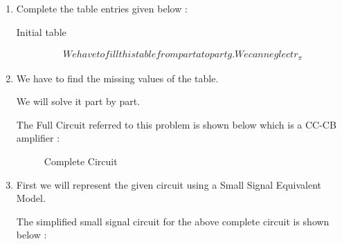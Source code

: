 \begin{enumerate}[label=\thesubsection.\arabic*.,ref=\thesubsection.\theenumi]
\item
Complete the table entries given below :

\vspace{1cm}

\solution

\begin{table}[!ht]
\centering
{}
\caption{Initial table}
\label{Table}
\end{table}

\begin{align}

 We have to fill this table from part a to part g. We can neglect r_{\pi}    

\end{align}


\item
We have to find the missing values of the table.
\vspace{0.2cm}

\solution
We will solve it part by part.
\vspace{0.2cm}


\vspace{1cm}

The Full Circuit referred to this problem is shown below which is a CC-CB amplifier : 

\vspace{25cm}



\begin{figure}[!ht]
	\begin{center}
				\resizebox{\columnwidth}{!}{}
	\end{center}
\caption{Complete Circuit }
\label{fig:circuit_1}
\end{figure}

\vspace{0.3cm}





\item
First we will represent the given circuit using a Small Signal Equivalent Model.

\vspace{0.2cm}

\solution The simplified small signal circuit for the above complete circuit is shown below :


\end{enumerate}
